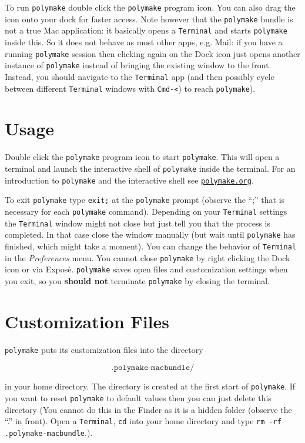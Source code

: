 \documentclass[a4paper]{amsart}
\newcommand{\polymake}{\texttt{polymake}\xspace}
\begin{document}
To run \polymake double click the \polymake program icon. You can
also drag the icon onto your dock for faster access. Note however that
the \polymake bundle is not a true Mac application: it basically
opens a \texttt{Terminal} and starts \polymake inside this. So it does not
behave as most other apps, e.g. Mail: if you have a running \polymake
session then clicking again on the Dock icon just opens another
instance of \polymake instead of bringing the existing window to the
front. Instead, you should navigate to the \texttt{Terminal} app (and then
possibly cycle between different \texttt{Terminal} windows with \texttt{Cmd-<})
to reach \polymake).

\section*{Usage}

Double click the \polymake program icon to start \polymake. This will
open a terminal and launch the interactive shell of \polymake inside
the terminal. For an introduction to \polymake and the interactive
shell see \href{http://polymake.org}{\tt polymake.org}\;.

To exit \polymake type \texttt{exit;} at the \polymake prompt
(observe the ``;'' that is necessary for each \polymake
command). Depending on your \texttt{Terminal} settings the
\texttt{Terminal} window might not close but just tell you that the
process is completed. In that case close the window manually (but wait
until \polymake has finished, which might take a moment). You can
change the behavior of \texttt{Terminal} in the \textit{Preferences}
menu.  You cannot close \polymake by right clicking the Dock icon or
via Expos\`e. \polymake saves open files and customization settings
when you exit, so you \textbf{should not} terminate \polymake by
closing the terminal.

\section*{Customization Files}

\polymake puts its customization files into the directory 

\[\texttt{.polymake-macbundle/} \]

in your home directory. The directory is created at the first start of
\polymake. If you want to reset \polymake to default values then you
can just delete this directory (You cannot do this in the Finder as it
is a hidden folder (observe the ``.'' in front). Open a \texttt{Terminal},
\texttt{cd} into your home directory and type \texttt{rm -rf
  .polymake-macbundle}.).
\end{document}
